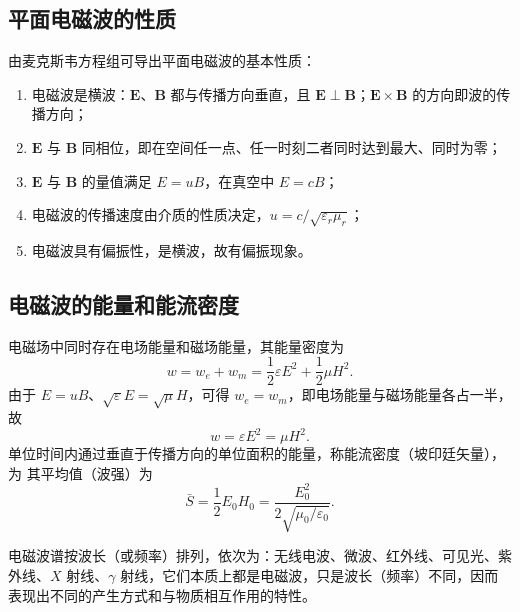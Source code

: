     \subsection{平面电磁波的性质}
    由麦克斯韦方程组可导出平面电磁波的基本性质：
    \begin{enumerate}
        \item 电磁波是横波：$\boldsymbol{E}$、$\boldsymbol{B}$ 都与传播方向垂直，且 $\boldsymbol{E}\perp\boldsymbol{B}$；$\boldsymbol{E}\times\boldsymbol{B}$ 的方向即波的传播方向；
        \item $\boldsymbol{E}$ 与 $\boldsymbol{B}$ 同相位，即在空间任一点、任一时刻二者同时达到最大、同时为零；
        \item $\boldsymbol{E}$ 与 $\boldsymbol{B}$ 的量值满足 $E=uB$，在真空中 $E=cB$；
        \item 电磁波的传播速度由介质的性质决定，$u=c/\sqrt{\varepsilon_r\mu_r}$；
        \item 电磁波具有偏振性，是横波，故有偏振现象。
    \end{enumerate}

    \subsection{电磁波的能量和能流密度}
    电磁场中同时存在电场能量和磁场能量，其能量密度为
    \[
    w=w_e+w_m=\frac{1}{2}\varepsilon E^{2}+\frac{1}{2}\mu H^{2}.
    \]
    由于 $E=uB$、$\sqrt{\varepsilon}E=\sqrt{\mu}H$，可得 $w_e=w_m$，即电场能量与磁场能量各占一半，故
    \[
    w=\varepsilon E^{2}=\mu H^{2}.
    \]
    单位时间内通过垂直于传播方向的单位面积的能量，称能流密度（坡印廷矢量），为
    其平均值（波强）为
    \[
    \bar{S}=\frac{1}{2}E_0H_0=\frac{E_0^{2}}{2\sqrt{\mu_0/\varepsilon_0}}.
    \]

    电磁波谱按波长（或频率）排列，依次为：无线电波、微波、红外线、可见光、紫外线、$X$ 射线、$\gamma$ 射线，它们本质上都是电磁波，只是波长（频率）不同，因而表现出不同的产生方式和与物质相互作用的特性。

